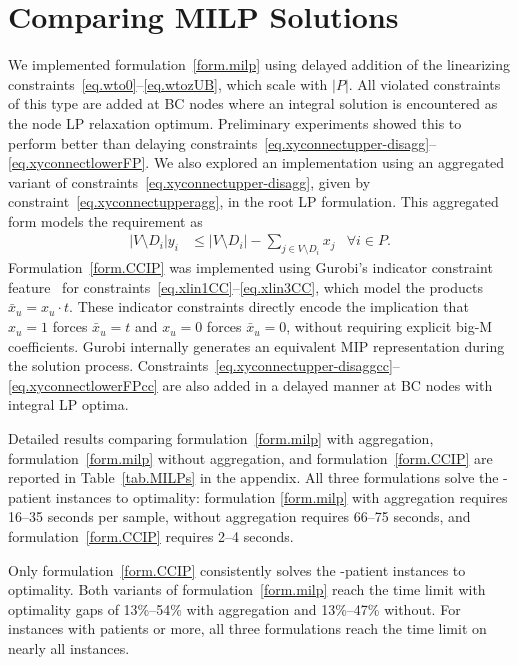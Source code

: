 
\section{Comparing MILP Solutions}\label{sec.milp-dcg}

We implemented formulation~\eqref{form.milp} using delayed addition of
the linearizing constraints~\eqref{eq.wto0}--\eqref{eq.wtozUB}, which
scale with $|P|$. All violated constraints of this type are added at
BC nodes where an integral solution is encountered as the node LP
relaxation optimum. Preliminary experiments showed this to perform
better than delaying
constraints~\eqref{eq.xyconnectupper-disagg}--\eqref{eq.xyconnectlowerFP}.
We also explored an implementation using an aggregated variant of
constraints~\eqref{eq.xyconnectupper-disagg}, given by
constraint~\eqref{eq.xyconnectupperagg}, in the root LP formulation.
This aggregated form models the requirement as
\begin{align}
    |V \setminus D_i| y_i &\le |V \setminus D_i| - \sum_{j \in V
    \setminus D_i} x_j & \forall i \in P.
    \label{eq.xyconnectupperagg}
\end{align}
Formulation~\eqref{form.CCIP} was implemented using Gurobi's indicator
constraint feature~\citep{gurobi-indicator} for
constraints~\eqref{eq.xlin1CC}--\eqref{eq.xlin3CC}, which model the
products $\bar{x}_u = x_u \cdot t$. These indicator constraints
directly encode the implication that $x_u = 1$ forces $\bar{x}_u = t$
and $x_u = 0$ forces $\bar{x}_u = 0$, without requiring explicit
big-M coefficients. Gurobi internally generates an equivalent MIP
representation during the solution process.
Constraints~\eqref{eq.xyconnectupper-disaggcc}--\eqref{eq.xyconnectlowerFPcc}
are also added in a delayed manner at BC nodes with integral LP optima.

Detailed results comparing formulation~\eqref{form.milp} with
aggregation, formulation~\eqref{form.milp} without aggregation, and
formulation~\eqref{form.CCIP} are reported in Table~\ref{tab.MILPs}
in the appendix. All three formulations solve the
-patient instances to optimality: formulation
\eqref{form.milp} with aggregation requires 16--35 seconds per sample,
without aggregation requires 66--75 seconds, and
formulation~\eqref{form.CCIP} requires 2--4 seconds.

Only formulation~\eqref{form.CCIP} consistently solves the
-patient instances to optimality. Both variants of
formulation~\eqref{form.milp} reach the time limit with optimality
gaps of 13\%--54\% with aggregation and 13\%--47\% without. For
instances with  patients or more, all three
formulations reach the time limit on nearly all instances.

